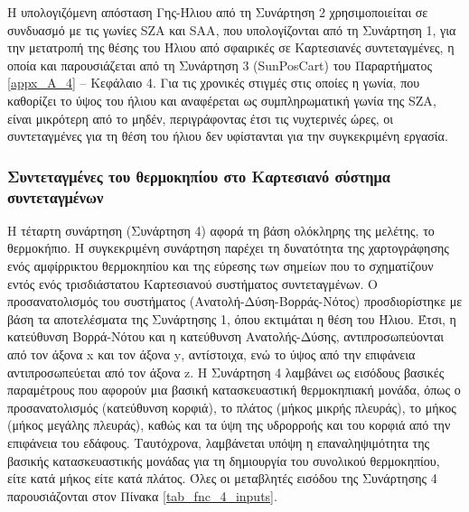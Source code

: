 \documentclass[12pt, a4paper]{report} %
\newcommand{\english}{\foreignlanguage{english}}
\begin{document}
Η υπολογιζόμενη απόσταση Γης-Ήλιου από τη Συνάρτηση 2 χρησιμοποιείται σε συνδυασμό με τις γωνίες \english{SZA} και 
\english{SAA}, που υπολογίζονται από τη Συνάρτηση 1, για την μετατροπή της θέσης του Ήλιου από σφαιρικές σε Καρτεσιανές 
συντεταγμένες, η οποία και παρουσιάζεται από τη Συνάρτηση 3 (\english{SunPosCart}) του Παραρτήματος 
\ref{appx_A_4} – Κεφάλαιο 4. Για τις χρονικές στιγμές στις οποίες η γωνία, που καθορίζει το ύψος του ήλιου και αναφέρεται ως 
συμπληρωματική γωνία της \english{SZA}, είναι μικρότερη από το μηδέν, περιγράφοντας έτσι τις νυχτερινές ώρες, οι 
συντεταγμένες για τη θέση του ήλιου δεν υφίστανται για την συγκεκριμένη εργασία.

\subsubsection{Συντεταγμένες του θερμοκηπίου στο Καρτεσιανό σύστημα συντεταγμένων}\label{subsub_greenhouse_coord}

Η τέταρτη συνάρτηση (Συνάρτηση 4) αφορά τη βάση ολόκληρης της μελέτης, το θερμοκήπιο. Η συγκεκριμένη συνάρτηση 
παρέχει τη δυνατότητα της χαρτογράφησης ενός αμφίρρικτου θερμοκηπίου και της εύρεσης των σημείων που το σχηματίζουν 
εντός ενός τρισδιάστατου Καρτεσιανού συστήματος συντεταγμένων. Ο προσανατολισμός του συστήματος 
(Ανατολή-Δύση-Βορράς-Νότος) προσδιορίστηκε με βάση τα αποτελέσματα της Συνάρτησης 1, όπου εκτιμάται η θέση του Ήλιου. 
Έτσι, η κατεύθυνση Βορρά-Νότου και η κατεύθυνση Ανατολής-Δύσης, αντιπροσωπεύονται από τον άξονα \english{x} και τον 
άξονα \english{y}, αντίστοιχα, ενώ το ύψος από την επιφάνεια αντιπροσωπεύεται από τον άξονα \english{z}. Η Συνάρτηση 
4 λαμβάνει ως εισόδους βασικές παραμέτρους που αφορούν μια βασική κατασκευαστική θερμοκηπιακή μονάδα, όπως ο 
προσανατολισμός (κατεύθυνση κορφιά), το πλάτος (μήκος μικρής πλευράς), το μήκος (μήκος μεγάλης πλευράς), καθώς και τα 
ύψη της υδρορροής και του κορφιά από την επιφάνεια του εδάφους. Ταυτόχρονα, λαμβάνεται υπόψη η επαναληψιμότητα της 
βασικής κατασκευαστικής μονάδας για τη δημιουργία του συνολικού θερμοκηπίου, είτε κατά μήκος είτε κατά πλάτος. Όλες 
οι μεταβλητές εισόδου της Συνάρτησης 4 παρουσιάζονται στον Πίνακα \ref{tab_fnc_4_inputs}.
\end{document}
